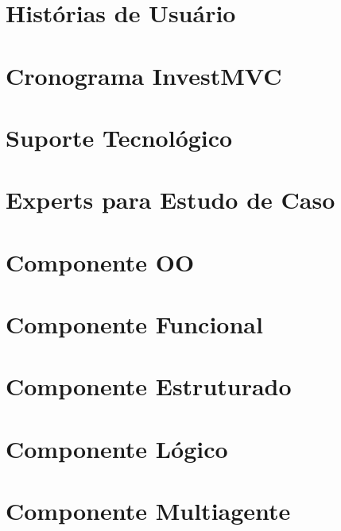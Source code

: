 \begin{apendicesenv}

\partapendices

\chapter{Histórias de Usuário}


\chapter{Cronograma InvestMVC}


\chapter{Suporte Tecnológico}


\chapter{Experts para Estudo de Caso}


\chapter{Componente OO}



\chapter{Componente Funcional}



\chapter{Componente Estruturado}


\chapter{Componente Lógico}



\chapter{Componente Multiagente}



\end{apendicesenv}
